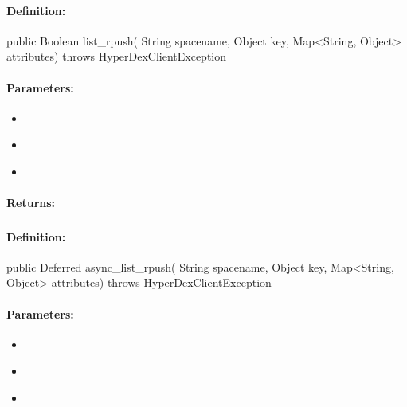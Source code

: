 \paragraph{Definition:}
\begin{javacode}
public Boolean list_rpush(
        String spacename,
        Object key,
        Map<String, Object> attributes) throws HyperDexClientException
\end{javacode}

\paragraph{Parameters:}
\begin{itemize}[noitemsep]
\item {}\\

\item {}\\

\item {}\\

\end{itemize}

\paragraph{Returns:}


\pagebreak
\subsubsection{}
\label{api:java:async_list_rpush}


\paragraph{Definition:}
\begin{javacode}
public Deferred async_list_rpush(
        String spacename,
        Object key,
        Map<String, Object> attributes) throws HyperDexClientException
\end{javacode}

\paragraph{Parameters:}
\begin{itemize}[noitemsep]
\item {}\\

\item {}\\

\item {}\\

\end{itemize}


